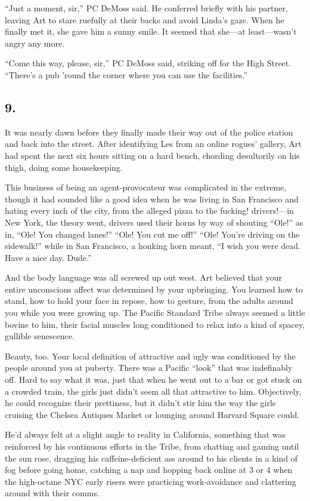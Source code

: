 “Just a moment, sir,” PC DeMoss said. He conferred briefly with his
partner, leaving Art to stare ruefully at their backs and avoid
Linda’s gaze. When he finally met it, she gave him a sunny smile.
It seemed that she—at least—wasn’t angry any more.

“Come this way, please, sir,” PC DeMoss said, striking off for the
High Street. “There’s a pub ’round the corner where you can use the
facilities.”

\subsection{9.}

It was nearly dawn before they finally made their way out of the
police station and back into the street. After identifying Les from
an online rogues’ gallery, Art had spent the next six hours sitting
on a hard bench, chording desultorily on his thigh, doing some
housekeeping.

This business of being an agent-provocateur was complicated in the
extreme, though it had sounded like a good idea when he was living
in San Francisco and hating every inch of the city, from the
alleged pizza to the fucking! drivers!—in New York, the theory
went, drivers used their horns by way of shouting “Ole!” as in,
“Ole! You changed lanes!” “Ole! You cut me off!” “Ole! You’re
driving on the sidewalk!” while in San Francisco, a honking horn
meant, “I wish you were dead. Have a nice day. Dude.”

And the body language was all screwed up out west. Art believed
that your entire unconscious affect was determined by your
upbringing. You learned how to stand, how to hold your face in
repose, how to gesture, from the adults around you while you were
growing up. The Pacific Standard Tribe always seemed a little
bovine to him, their facial muscles long conditioned to relax into
a kind of spacey, gullible senescence.

Beauty, too. Your local definition of attractive and ugly was
conditioned by the people around you at puberty. There was a
Pacific “look” that was indefinably off. Hard to say what it was,
just that when he went out to a bar or got stuck on a crowded
train, the girls just didn’t seem all that attractive to him.
Objectively, he could recognize their prettiness, but it didn’t
stir him the way the girls cruising the Chelsea Antiques Market or
lounging around Harvard Square could.

He’d always felt at a slight angle to reality in California,
something that was reinforced by his continuous efforts in the
Tribe, from chatting and gaming until the sun rose, dragging his
caffeine-deficient ass around to his clients in a kind of fog
before going home, catching a nap and hopping back online at 3 or 4
when the high-octane NYC early risers were practicing
work-avoidance and clattering around with their comms.

